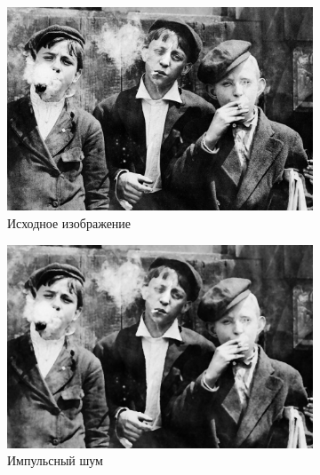 \begin{figure}[ht!] 
    \centering
    \begin{subfigure}[b]{0.5\linewidth}
        \centering
        \includegraphics[width=0.95\linewidth]{../lewis-hine-taschen-main-3.jpg} 
        \caption{Исходное изображение} 
        \label{median_5:a} 
        \vspace{4ex}
    \end{subfigure}%
    \begin{subfigure}[b]{0.5\linewidth}
      \centering
      \includegraphics[width=0.95\linewidth]{../Median_FIlter/Median_Impulse_noise_(k=5).jpg} 
      \caption{Импульсный шум} 
      \label{median_5:b} 
      \vspace{4ex}
    \end{subfigure}
    \begin{subfigure}[b]{0.5\linewidth}
      \centering

\end{subfigure}
\end{figure}
